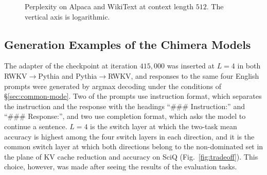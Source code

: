 \documentclass[conference]{IEEEtran}
\newcommand{\figref}[1]{Fig.~\ref{#1}}
\newcommand{\RtoP}{RWKV$\to$\allowbreak Pythia}
\newcommand{\PtoR}{Pythia$\to$\allowbreak RWKV}
\begin{document}
\begin{figure}[!htb]\centering
{}
\caption{Perplexity on Alpaca and WikiText at context length $512$. The vertical axis is logarithmic.}
\label{fig:domain}
\end{figure}

\subsection{Generation Examples of the Chimera Models}\label{sec:chimera}
The adapter of the checkpoint at iteration $415{,}000$ was inserted at $L{=}4$ in both \RtoP{} and \PtoR{}, and responses to the same four English prompts
were generated by argmax decoding under the conditions of \S\ref{sec:common-mode}. Two of the prompts use instruction format, which
separates the instruction and the response with the headings ``\#\#\# Instruction:'' and ``\#\#\# Response:'', and two use completion
format, which asks the model to continue a sentence. $L{=}4$ is the switch layer at which the two-task mean accuracy is highest among
the four switch layers in each direction, and it is the common switch layer at which both directions belong to the non-dominated set in
the plane of KV cache reduction and accuracy on SciQ (\figref{fig:tradeoff}).
This choice, however, was made after seeing the results of the evaluation tasks.
\end{document}
